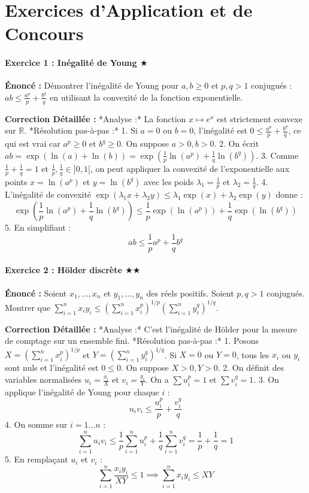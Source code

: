 \documentclass[11pt,a4paper]{article}
\begin{document}
\newpage
\part{Exercices d'Application et de Concours}
\subsection*{Exercice 1 : Inégalité de Young $\bigstar$}

\textbf{Énoncé :} Démontrer l'inégalité de Young pour $a, b \ge 0$ et $p, q > 1$ conjugués : $ab \le \frac{a^p}{p} + \frac{b^q}{q}$ en utilisant la convexité de la fonction exponentielle.

\textbf{Correction Détaillée :}
*Analyse :* La fonction $x \mapsto e^x$ est strictement convexe sur $\mathbb{R}$.
*Résolution pas-à-pas :*
1. Si $a=0$ ou $b=0$, l'inégalité est $0 \le \frac{a^p}{p} + \frac{b^q}{q}$, ce qui est vrai car $a^p \ge 0$ et $b^q \ge 0$. On suppose $a>0, b>0$.
2. On écrit $ab = \exp(\ln(a) + \ln(b)) = \exp(\frac{1}{p}\ln(a^p) + \frac{1}{q}\ln(b^q))$.
3. Comme $\frac{1}{p} + \frac{1}{q} = 1$ et $\frac{1}{p}, \frac{1}{q} \in ]0, 1[$, on peut appliquer la convexité de l'exponentielle aux points $x = \ln(a^p)$ et $y = \ln(b^q)$ avec les poids $\lambda_1 = \frac{1}{p}$ et $\lambda_2 = \frac{1}{q}$.
4. L'inégalité de convexité $\exp(\lambda_1 x + \lambda_2 y) \le \lambda_1 \exp(x) + \lambda_2 \exp(y)$ donne :
   $$\exp\left(\frac{1}{p}\ln(a^p) + \frac{1}{q}\ln(b^q)\right) \le \frac{1}{p}\exp(\ln(a^p)) + \frac{1}{q}\exp(\ln(b^q))$$
5. En simplifiant :
   $$ab \le \frac{1}{p}a^p + \frac{1}{q}b^q$$


\subsection*{Exercice 2 : Hölder discrète $\bigstar\bigstar$}

\textbf{Énoncé :} Soient $x_1, \dots, x_n$ et $y_1, \dots, y_n$ des réels positifs. Soient $p, q > 1$ conjugués. Montrer que $\sum_{i=1}^n x_i y_i \le \left(\sum_{i=1}^n x_i^p\right)^{1/p} \left(\sum_{i=1}^n y_i^q\right)^{1/q}$.

\textbf{Correction Détaillée :}
*Analyse :* C'est l'inégalité de Hölder pour la mesure de comptage sur un ensemble fini.
*Résolution pas-à-pas :*
1. Posons $X = (\sum_{i=1}^n x_i^p)^{1/p}$ et $Y = (\sum_{i=1}^n y_i^q)^{1/q}$. Si $X=0$ ou $Y=0$, tous les $x_i$ ou $y_i$ sont nuls et l'inégalité est $0 \le 0$. On suppose $X > 0, Y > 0$.
2. On définit des variables normalisées $u_i = \frac{x_i}{X}$ et $v_i = \frac{y_i}{Y}$. On a $\sum u_i^p = 1$ et $\sum v_i^q = 1$.
3. On applique l'inégalité de Young pour chaque $i$ :
   $$u_i v_i \le \frac{u_i^p}{p} + \frac{v_i^q}{q}$$
4. On somme sur $i = 1 \dots n$ :
   $$\sum_{i=1}^n u_i v_i \le \frac{1}{p} \sum_{i=1}^n u_i^p + \frac{1}{q} \sum_{i=1}^n v_i^q = \frac{1}{p} + \frac{1}{q} = 1$$
5. En remplaçant $u_i$ et $v_i$ :
   $$\sum_{i=1}^n \frac{x_i y_i}{X Y} \le 1 \implies \sum_{i=1}^n x_i y_i \le X Y$$
\end{document}
